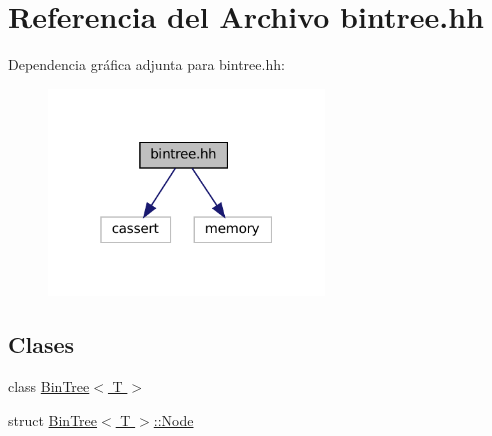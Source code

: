 \hypertarget{bintree_8hh}{}\section{Referencia del Archivo bintree.\+hh}
\label{bintree_8hh}
Dependencia gráfica adjunta para bintree.\+hh\+:
\nopagebreak
\begin{figure}[H]
\begin{center}
\leavevmode
\includegraphics[width=208pt]{bintree_8hh__incl}
\end{center}
\end{figure}
\subsection*{Clases}
\begin{DoxyCompactItemize}
\item 
class \hyperlink{class_bin_tree}{Bin\+Tree$<$ T $>$}
\item 
struct \hyperlink{struct_bin_tree_1_1_node}{Bin\+Tree$<$ T $>$\+::\+Node}
\end{DoxyCompactItemize}
